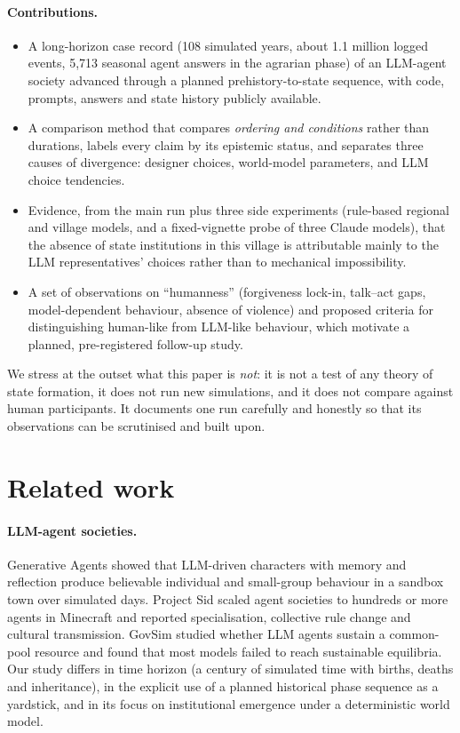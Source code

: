 \documentclass[11pt]{article}
\begin{document}
\paragraph{Contributions.}
\begin{itemize}
  \item A long-horizon case record (108 simulated years, about 1.1 million logged events, 5{,}713 seasonal agent answers in the agrarian phase) of an LLM-agent society advanced through a planned prehistory-to-state sequence, with code, prompts, answers and state history publicly available.
  \item A comparison method that compares \emph{ordering and conditions} rather than durations, labels every claim by its epistemic status, and separates three causes of divergence: designer choices, world-model parameters, and LLM choice tendencies.
  \item Evidence, from the main run plus three side experiments (rule-based regional and village models, and a fixed-vignette probe of three Claude models), that the absence of state institutions in this village is attributable mainly to the LLM representatives' choices rather than to mechanical impossibility.
  \item A set of observations on ``humanness'' (forgiveness lock-in, talk--act gaps, model-dependent behaviour, absence of violence) and proposed criteria for distinguishing human-like from LLM-like behaviour, which motivate a planned, pre-registered follow-up study.
\end{itemize}

We stress at the outset what this paper is \emph{not}: it is not a test of any theory of state formation, it does not run new simulations, and it does not compare against human participants. It documents one run carefully and honestly so that its observations can be scrutinised and built upon.

\section{Related work}

\paragraph{LLM-agent societies.}
Generative Agents \citep{park2023generative} showed that LLM-driven characters with memory and reflection produce believable individual and small-group behaviour in a sandbox town over simulated days. Project Sid \citep{altera2024sid} scaled agent societies to hundreds or more agents in Minecraft and reported specialisation, collective rule change and cultural transmission. GovSim \citep{piatti2024cooperate} studied whether LLM agents sustain a common-pool resource and found that most models failed to reach sustainable equilibria. Our study differs in time horizon (a century of simulated time with births, deaths and inheritance), in the explicit use of a planned historical phase sequence as a yardstick, and in its focus on institutional emergence under a deterministic world model.
\end{document}
